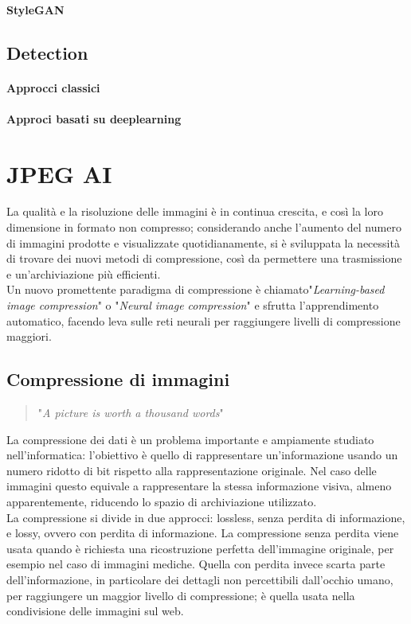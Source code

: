\paragraph{StyleGAN}

\subsection{Detection}
\paragraph{Approcci classici}
\paragraph{Approci basati su deeplearning}



\newpage

\section{JPEG AI} \label{sec:jpegai}
La qualità e la risoluzione delle immagini  è in continua crescita, e così la loro dimensione in formato non compresso; considerando anche l'aumento del numero di immagini prodotte e visualizzate quotidianamente, si è sviluppata la necessità di trovare dei nuovi metodi di compressione, così da permettere una trasmissione e un'archiviazione più efficienti.\\
Un nuovo promettente paradigma di compressione è chiamato"\textit{Learning-based image compression}" o "\textit{Neural image compression}" e sfrutta l'apprendimento automatico, facendo leva sulle reti neurali per raggiungere livelli di compressione maggiori.
\subsection{Compressione di immagini}
\begin{quote} 
    "\textit{A picture is worth a thousand words}"
\end{quote}
La compressione dei dati è un problema importante e ampiamente studiato nell'informatica: l'obiettivo è quello di rappresentare un'informazione usando un numero ridotto di bit rispetto alla rappresentazione originale. Nel caso delle immagini questo equivale a rappresentare la stessa informazione visiva, almeno apparentemente, riducendo lo spazio di archiviazione utilizzato.\\
La compressione si divide in due approcci: lossless,  senza perdita di informazione, e lossy, ovvero con perdita di informazione.
La compressione senza perdita viene usata quando è richiesta una ricostruzione perfetta dell'immagine originale, per esempio nel caso di immagini mediche. Quella con perdita invece scarta parte dell'informazione, in particolare dei dettagli non percettibili dall'occhio umano, per raggiungere un maggior livello di compressione; è quella usata nella condivisione delle immagini sul web.
